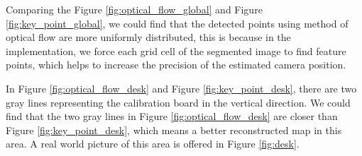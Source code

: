 \documentclass{easychair}
\begin{document}
Comparing the Figure \ref{fig:optical_flow_global} and Figure \ref{fig:key_point_global}, we could find that the detected points using method of optical flow are more uniformly distributed, this is because in the implementation, we force each grid cell of the segmented image to find feature points, which helps to increase the precision of the estimated camera position.

In Figure \ref{fig:optical_flow_desk} and Figure \ref{fig:key_point_desk}, there are two gray lines representing the calibration board in the vertical direction. We could find that the two gray lines in Figure \ref{fig:optical_flow_desk} are closer than Figure \ref{fig:key_point_desk}, which means a better reconstructed map in this area. A real world picture of this area is offered in Figure \ref{fig:desk}.
\end{document}
